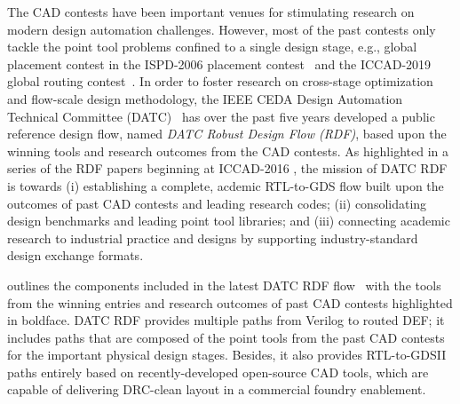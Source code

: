 
The CAD contests have been important venues for stimulating research on modern design automation challenges.
However, most of the past contests only tackle the point tool problems confined to a single design stage, e.g., global placement contest in the ISPD-2006 placement contest~\cite{nam:2006is} and the ICCAD-2019 global routing contest~\cite{dolgov:2019ca}.
In order to foster research on cross-stage optimization and flow-scale design methodology, the IEEE CEDA Design Automation Technical Committee (DATC)~\cite{ieee-datc} has over the past five years developed a public reference design flow, named \textit{DATC Robust Design Flow (RDF)}, based upon the winning tools and research outcomes from the CAD contests.
As highlighted in a series of the RDF papers beginning at ICCAD-2016 \cite{jung:2016od,jung:2017dr,jung:2018dr,jung:2018drod,chen:2019da,chen:2020da}, the mission of DATC RDF is towards (i) establishing a complete, acdemic RTL-to-GDS flow built upon the outcomes of past CAD contests and leading research codes; (ii) consolidating design benchmarks and leading point tool libraries; and (iii) connecting academic research to industrial practice and designs by supporting industry-standard design exchange formats.  

 outlines the components included in the latest DATC RDF flow~\cite{chen:2020da} with the tools from the winning entries and research outcomes of past CAD contests highlighted in boldface.
DATC RDF provides multiple paths from Verilog to routed DEF; it includes paths that are composed of the point tools from the past CAD contests for the important physical design stages. 
Besides, it also provides RTL-to-GDSII paths entirely based on recently-developed open-source CAD tools, which are capable of delivering DRC-clean layout in a commercial foundry enablement.

